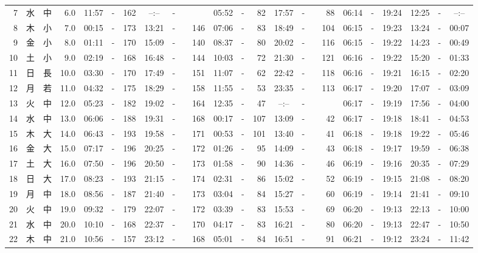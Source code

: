 \documentclass[12pt,a4j]{jsarticle}
\begin{document}
\begin{table}[htbp]
\begin{center}
{\begin{tabular}{|rc|cr|ccrccr|ccrccr|ccc|ccc|}
 7 & 水 & 中 &  6.0 &  11:57 &-& 162 &  --:-- &-&~~~~~ &  05:52 &-&  82 &  17:57 &-&  88 & 06:14 & -& 19:24 & 12:25 & -& --:-- \\
 8 & 木 & 小 &  7.0 &  00:15 &-& 173 &  13:21 &-& 146 &  07:06 &-&  83 &  18:49 &-& 104 & 06:15 & -& 19:23 & 13:24 & -& 00:07 \\
 9 & 金 & 小 &  8.0 &  01:11 &-& 170 &  15:09 &-& 140 &  08:37 &-&  80 &  20:02 &-& 116 & 06:15 & -& 19:22 & 14:23 & -& 00:49 \\
10 & 土 & 小 &  9.0 &  02:19 &-& 168 &  16:48 &-& 144 &  10:03 &-&  72 &  21:30 &-& 121 & 06:16 & -& 19:22 & 15:20 & -& 01:33 \\
11 & 日 & 長 & 10.0 &  03:30 &-& 170 &  17:49 &-& 151 &  11:07 &-&  62 &  22:42 &-& 118 & 06:16 & -& 19:21 & 16:15 & -& 02:20 \\
12 & 月 & 若 & 11.0 &  04:32 &-& 175 &  18:29 &-& 158 &  11:55 &-&  53 &  23:35 &-& 113 & 06:17 & -& 19:20 & 17:07 & -& 03:09 \\
13 & 火 & 中 & 12.0 &  05:23 &-& 182 &  19:02 &-& 164 &  12:35 &-&  47 &  --:-- &-&~~~~~ & 06:17 & -& 19:19 & 17:56 & -& 04:00 \\
14 & 水 & 中 & 13.0 &  06:06 &-& 188 &  19:31 &-& 168 &  00:17 &-& 107 &  13:09 &-&  42 & 06:17 & -& 19:18 & 18:41 & -& 04:53 \\
15 & 木 & 大 & 14.0 &  06:43 &-& 193 &  19:58 &-& 171 &  00:53 &-& 101 &  13:40 &-&  41 & 06:18 & -& 19:18 & 19:22 & -& 05:46 \\
16 & 金 & 大 & 15.0 &  07:17 &-& 196 &  20:25 &-& 172 &  01:26 &-&  95 &  14:09 &-&  43 & 06:18 & -& 19:17 & 19:59 & -& 06:38 \\
17 & 土 & 大 & 16.0 &  07:50 &-& 196 &  20:50 &-& 173 &  01:58 &-&  90 &  14:36 &-&  46 & 06:19 & -& 19:16 & 20:35 & -& 07:29 \\
18 & 日 & 大 & 17.0 &  08:23 &-& 193 &  21:15 &-& 174 &  02:31 &-&  86 &  15:02 &-&  52 & 06:19 & -& 19:15 & 21:08 & -& 08:20 \\
19 & 月 & 中 & 18.0 &  08:56 &-& 187 &  21:40 &-& 173 &  03:04 &-&  84 &  15:27 &-&  60 & 06:19 & -& 19:14 & 21:41 & -& 09:10 \\
20 & 火 & 中 & 19.0 &  09:32 &-& 179 &  22:07 &-& 172 &  03:39 &-&  83 &  15:53 &-&  69 & 06:20 & -& 19:13 & 22:13 & -& 10:00 \\
21 & 水 & 中 & 20.0 &  10:10 &-& 168 &  22:37 &-& 170 &  04:17 &-&  83 &  16:21 &-&  80 & 06:20 & -& 19:13 & 22:47 & -& 10:50 \\
22 & 木 & 中 & 21.0 &  10:56 &-& 157 &  23:12 &-& 168 &  05:01 &-&  84 &  16:51 &-&  91 & 06:21 & -& 19:12 & 23:24 & -& 11:42 \\

\end{tabular}}
\end{center}
\end{table}
\end{document}
